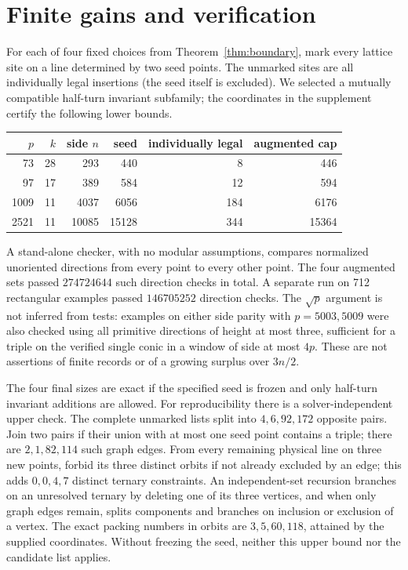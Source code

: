 \documentclass[11pt]{article}
\begin{document}
\section{Finite gains and verification}
For each of four fixed choices from Theorem~\ref{thm:boundary}, mark every lattice site on a line determined by two seed points. The unmarked sites are all individually legal insertions (the seed itself is excluded). We selected a mutually compatible half-turn invariant subfamily; the coordinates in the supplement certify the following lower bounds.
\begin{center}\begin{tabular}{rrrrrr}\toprule
$p$&$k$&side $n$&seed&individually legal&augmented cap\\\midrule
73&28&293&440&8&446\\97&17&389&584&12&594\\1009&11&4037&6056&184&6176\\2521&11&10085&15128&344&15364\\\bottomrule\end{tabular}\end{center}
A stand-alone checker, with no modular assumptions, compares normalized unoriented directions from every point to every other point. The four augmented sets passed $274724644$ such direction checks in total. A separate run on 712 rectangular examples passed $146705252$ direction checks. The $\sqrt p$ argument is not inferred from tests: examples on either side parity with $p=5003,5009$ were also checked using all primitive directions of height at most three, sufficient for a triple on the verified single conic in a window of side at most $4p$. These are not assertions of finite records or of a growing surplus over $3n/2$.

The four final sizes are exact if the specified seed is frozen and only half-turn invariant additions are allowed. For reproducibility there is a solver-independent upper check. The complete unmarked lists split into $4,6,92,172$ opposite pairs. Join two pairs if their union with at most one seed point contains a triple; there are $2,1,82,114$ such graph edges. From every remaining physical line on three new points, forbid its three distinct orbits if not already excluded by an edge; this adds $0,0,4,7$ distinct ternary constraints. An independent-set recursion branches on an unresolved ternary by deleting one of its three vertices, and when only graph edges remain, splits components and branches on inclusion or exclusion of a vertex. The exact packing numbers in orbits are $3,5,60,118$, attained by the supplied coordinates. Without freezing the seed, neither this upper bound nor the candidate list applies.
\end{document}

